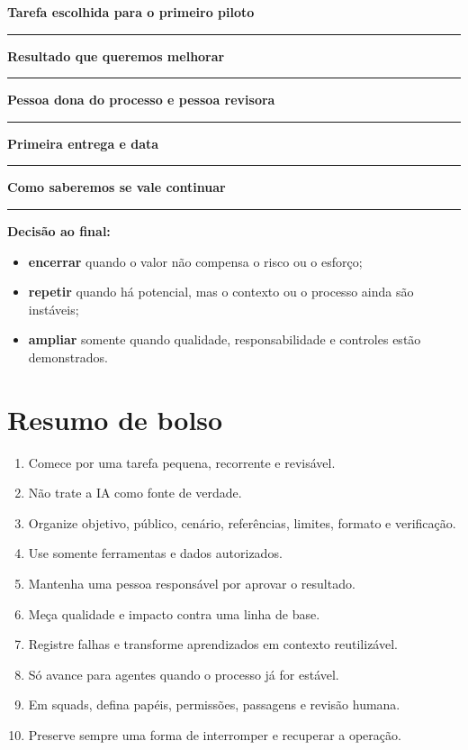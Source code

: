 \documentclass[11pt,a4paper]{article}
\newcommand{\campo}[1]{\textbf{#1}\par\vspace{1mm}\textcolor{line}{\rule{\linewidth}{0.6pt}}\par\vspace{2mm}}
\begin{document}
\begin{atividade}[title={COMPROMISSO DA EQUIPE}]
\campo{Tarefa escolhida para o primeiro piloto}
\campo{Resultado que queremos melhorar}
\campo{Pessoa dona do processo e pessoa revisora}
\campo{Primeira entrega e data}
\campo{Como saberemos se vale continuar}
\end{atividade}

\begin{destaque}
\textbf{Decisão ao final:}
\begin{itemize}
  \item \textbf{encerrar} quando o valor não compensa o risco ou o esforço;
  \item \textbf{repetir} quando há potencial, mas o contexto ou o processo ainda são instáveis;
  \item \textbf{ampliar} somente quando qualidade, responsabilidade e controles estão demonstrados.
\end{itemize}
\end{destaque}

\newpage
\section*{Resumo de bolso}

\begin{tcolorbox}[colback=branddark,colframe=branddark,arc=2mm,left=6mm,right=6mm,top=5mm,bottom=5mm]
\color{white}
\begin{enumerate}
  \item Comece por uma tarefa pequena, recorrente e revisável.
  \item Não trate a IA como fonte de verdade.
  \item Organize objetivo, público, cenário, referências, limites, formato e verificação.
  \item Use somente ferramentas e dados autorizados.
  \item Mantenha uma pessoa responsável por aprovar o resultado.
  \item Meça qualidade e impacto contra uma linha de base.
  \item Registre falhas e transforme aprendizados em contexto reutilizável.
  \item Só avance para agentes quando o processo já for estável.
  \item Em squads, defina papéis, permissões, passagens e revisão humana.
  \item Preserve sempre uma forma de interromper e recuperar a operação.
\end{enumerate}
\end{tcolorbox}
\end{document}
